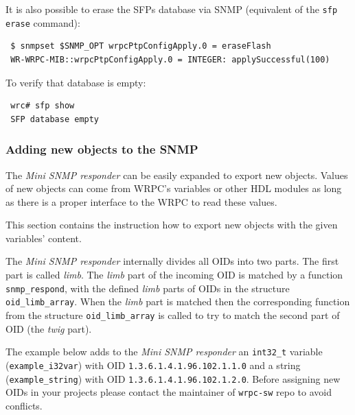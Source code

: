 \documentclass[a4paper, 12pt]{article}
\begin{document}
It is also possible to erase the SFPs database via SNMP (equivalent of
the \texttt{sfp erase} command):
\begin{lstlisting}
 $ snmpset $SNMP_OPT wrpcPtpConfigApply.0 = eraseFlash
 WR-WRPC-MIB::wrpcPtpConfigApply.0 = INTEGER: applySuccessful(100)
\end{lstlisting}

To verify that database is empty:
\begin{lstlisting}
 wrc# sfp show
 SFP database empty
\end{lstlisting}

\subsubsection{Adding new objects to the SNMP}
\label{Adding new objects to the SNMP}

The \textit{Mini SNMP responder} can be easily expanded to export new objects.
Values of new objects can come from WRPC's variables or other HDL modules
as long as there is a proper interface to the WRPC to read these values.

This section contains the instruction how to export new objects with
the given variables' content.

The \textit{Mini SNMP responder} internally divides all OIDs into two parts.
The first part is called \textit{limb}. The \textit{limb} part of the incoming OID is
matched by a function \texttt{snmp\_respond}, with the defined \textit{limb} parts of OIDs
in the structure \texttt{oid\_limb\_array}.
When the \textit{limb} part is matched then the corresponding function from
the structure \texttt{oid\_limb\_array} is called to try to match the second part of
OID (the \textit{twig} part).

\begin{sloppypar} %
The example below adds to the \textit{Mini SNMP responder} an \texttt{int32\_t} variable
(\texttt{example\_i32var}) with OID \texttt{1.3.6.1.4.1.96.102.1.1.0} and a string
(\texttt{example\_string}) with OID \texttt{1.3.6.1.4.1.96.102.1.2.0}.
Before assigning new OIDs in your projects please contact the maintainer of
\texttt{wrpc-sw} repo to avoid conflicts.
\end{sloppypar}
\end{document}
